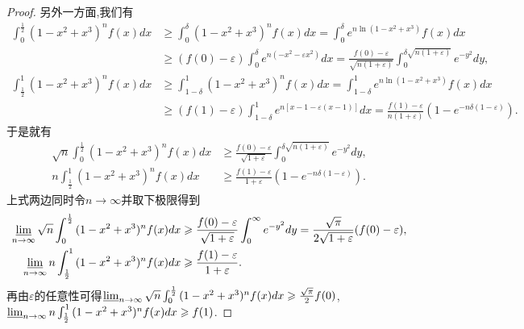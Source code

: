 \documentclass[lang=cn,newtx,10pt,scheme=chinese]{elegantbook}
\begin{document}
\begin{proof}
另外一方面,我们有
\begin{align*}
\int_0^{\frac{1}{2}}{(1 - x^2 + x^3)^nf(x)dx}&\geqslant \int_0^{\delta}{(1 - x^2 + x^3)^nf(x)dx}=\int_0^{\delta}{e^{n\ln(1 - x^2 + x^3)}f(x)dx}\\
&\geqslant (f(0) - \varepsilon)\int_0^{\delta}{e^{n(-x^2 - \varepsilon x^2)}dx}=\frac{f(0) - \varepsilon}{\sqrt{n(1 + \varepsilon)}}\int_0^{\delta\sqrt{n(1 + \varepsilon)}}{e^{-y^2}dy},
\end{align*}
\begin{align*}
\int_{\frac{1}{2}}^1{(1 - x^2 + x^3)^nf(x)dx}&\geqslant \int_{1 - \delta}^1{(1 - x^2 + x^3)^nf(x)dx}=\int_{1 - \delta}^1{e^{n\ln(1 - x^2 + x^3)}f(x)dx}\\
&\geqslant (f(1) - \varepsilon)\int_{1 - \delta}^1{e^{n[x - 1 - \varepsilon(x - 1)]}dx}=\frac{f(1) - \varepsilon}{n(1 + \varepsilon)}\left(1 - e^{-n\delta(1 - \varepsilon)}\right).
\end{align*}
于是就有
\begin{align*}
\sqrt{n}\int_0^{\frac{1}{2}}{(1 - x^2 + x^3)^nf(x)dx}&\geqslant \frac{f(0) - \varepsilon}{\sqrt{1 + \varepsilon}}\int_0^{\delta\sqrt{n(1 + \varepsilon)}}{e^{-y^2}dy},\\
n\int_{\frac{1}{2}}^1{(1 - x^2 + x^3)^nf(x)dx}&\geqslant \frac{f(1) - \varepsilon}{1 + \varepsilon}\left(1 - e^{-n\delta(1 - \varepsilon)}\right).
\end{align*}
上式两边同时令\(n\rightarrow\infty\)并取下极限得到
\begin{align*}
\varliminf_{n\rightarrow\infty}\sqrt{n}\int_0^{\frac{1}{2}}{(1 - x^2 + x^3)^nf(x)dx}&\geqslant \frac{f(0) - \varepsilon}{\sqrt{1 + \varepsilon}}\int_0^{\infty}{e^{-y^2}dy}=\frac{\sqrt{\pi}}{2\sqrt{1 + \varepsilon}}(f(0) - \varepsilon),\\
\varliminf_{n\rightarrow\infty}n\int_{\frac{1}{2}}^1{(1 - x^2 + x^3)^nf(x)dx}&\geqslant \frac{f(1) - \varepsilon}{1 + \varepsilon}.
\end{align*}
再由\(\varepsilon\)的任意性可得\(\varliminf_{n\rightarrow\infty}\sqrt{n}\int_0^{\frac{1}{2}}{(1 - x^2 + x^3)^nf(x)dx}\geqslant \frac{\sqrt{\pi}}{2}f(0)\),\(\varliminf_{n\rightarrow\infty}n\int_{\frac{1}{2}}^1{(1 - x^2 + x^3)^nf(x)dx}\geqslant f(1)\).


\end{proof}
\end{document}
